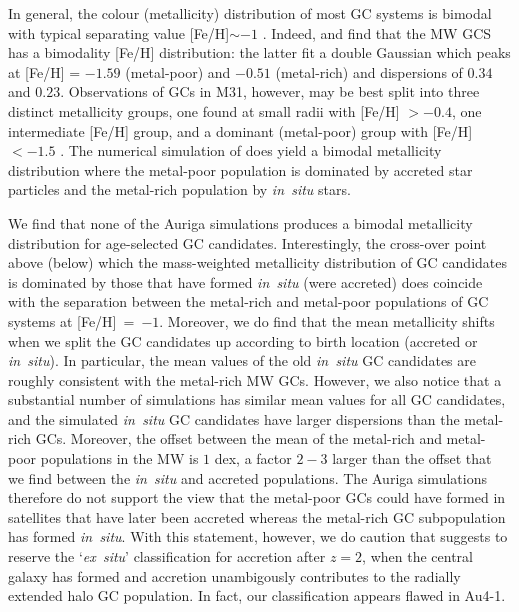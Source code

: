 \documentclass[a4paper,fleqn,usenatbib]{mnras}
\begin{document}
In general, the colour (metallicity) distribution of most GC systems is bimodal 
with typical separating value [Fe/H]$\sim -1$ \citep{1985ApJ...293..424Z,
1999AJ....118.1526G,2001AJ....121.2974L,2006ApJ...639...95P}. Indeed, 
\citet[][p. 234]{1998gcs..book.....A} and \citet[][p. 38]{Harris2001} find that
the MW GCS has a bimodality [Fe/H] distribution: the latter fit a double Gaussian 
which peaks at [Fe/H] = $-1.59$ (metal-poor) and $-0.51$ (metal-rich) and 
dispersions of $0.34$ and $0.23$. Observations of GCs in M31, however, may be
best split into three distinct metallicity groups, one found at small radii with 
[Fe/H] $>-0.4$, one intermediate [Fe/H] group, and a dominant (metal-poor) group 
with [Fe/H] $< -1.5$ \citep{2016ApJ...824...42C}. The numerical simulation of
\citet{2017MNRAS.465.3622R} does yield a bimodal metallicity distribution where
the metal-poor population is dominated by accreted star particles and the metal-rich
population by {\it in~situ} stars. 

We find that none of the Auriga simulations produces a bimodal 
metallicity distribution for age-selected GC candidates. Interestingly, the 
cross-over point above (below) which the mass-weighted metallicity distribution
of GC candidates is dominated by those that have formed {\it in~situ} (were
accreted) does coincide with the separation between the metal-rich and metal-poor
populations of GC systems at [Fe/H]~=~$-1$. Moreover, we do find that the mean
metallicity shifts when we split the GC candidates up according to birth location
(accreted or {\it in~situ}). In particular, the mean values of the old 
{\it in~situ} GC candidates are roughly consistent with the metal-rich MW GCs.
However, we also notice that a substantial number of simulations has similar 
mean values for all GC candidates, and the simulated {\it in~situ} GC candidates 
have larger dispersions than the metal-rich GCs. Moreover, the offset between 
the mean of the metal-rich and metal-poor populations in the MW is $1$ dex, a
factor $2-3$ larger than the offset that we find between the {\it in~situ} and 
accreted populations. The Auriga simulations therefore do not support the view 
that the metal-poor GCs could have formed in satellites that have later been 
accreted whereas the metal-rich GC subpopulation has formed {\it in~situ}. With 
this statement, however, we do caution that \citet{2019MNRAS.486.3134K} suggests 
to reserve the `{\it ex~situ}' classification for accretion after $z=2$, when
the central galaxy has formed and accretion unambigously contributes to the
radially extended halo GC population. In fact, our classification appears flawed
in Au4-1.
\end{document}
